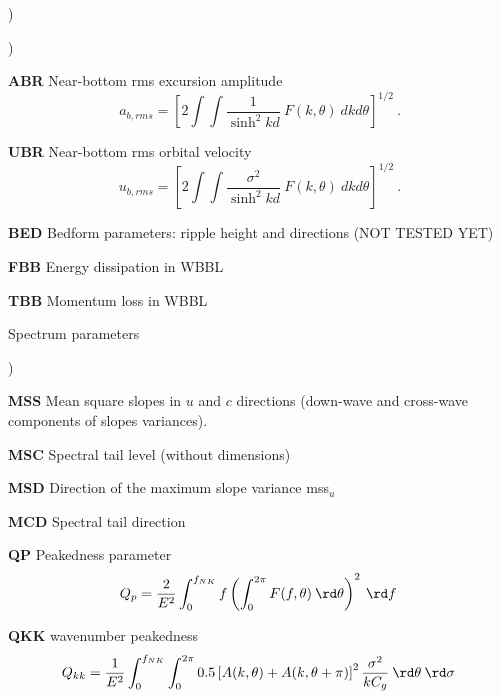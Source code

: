 \begin{list}{)\hfill}
\begin{list}{)\hfill}
\item \textbf{ABR} Near-bottom rms excursion amplitude
      \begin{equation} a_{b,rms} = \left [ 2 \int \!\!\!\! \int
      \frac{1}{\sinh^2 kd} \: F(k,\theta) \: dk d\theta \right ] ^{1/2}
      \: . \label{eq:ab_rms} \end{equation}
\item \textbf{UBR} Near-bottom rms orbital velocity
      \begin{equation} u_{b,rms} = \left [ 2 \int \!\!\!\! \int
      \frac{\sigma^2}{\sinh^2 kd} \: F(k,\theta) \: dk d\theta \right ] ^{1/2}
      \: . \label{eq:ub_rms} \end{equation}
\item \textbf{BED} Bedform parameters: ripple height and directions (NOT TESTED YET)   
\item \textbf{FBB} Energy dissipation in WBBL 
\item \textbf{TBB} Momentum loss in WBBL 
\end{list}

\item{Spectrum parameters}

\begin{list}{)\hfill}
            { \leftmargin 8mm 
             \rightmargin 0mm \itemsep 0mm \parsep 0mm}

\item \textbf{MSS} Mean square slopes in $u$ and $c$ directions (down-wave and cross-wave components of slopes variances). 
\item \textbf{MSC} Spectral tail level (without dimensions) 
\item \textbf{MSD} Direction of the maximum slope variance mss$_u$
\item \textbf{MCD} Spectral tail direction
\item \textbf{QP}  Peakedness parameter \citep{art:G70}
      \begin{equation} Q_p = \frac{2}{E^2} \int_0^{f_{NK}} f \left( \int_0^{2\pi} 
      F(f,\theta) \:\rd \theta \right)^2 \: \rd  f \: \label{eq:qp}
      \end{equation}
\item \textbf{QKK}  wavenumber peakedness \citep{art:DC23}
      \begin{equation} Q_{kk} = \frac{1}{E^2} \int_0^{f_{NK}} \int_0^{2\pi} 
      0.5 \left[ A(k,\theta)+ A(k,\theta+\pi)\right]^2 \frac{\sigma^2}{k C_g} \:\rd \theta  \: \rd  \sigma \: \label{eq:qkk}
      \end{equation}
\end{list}


\end{list}
